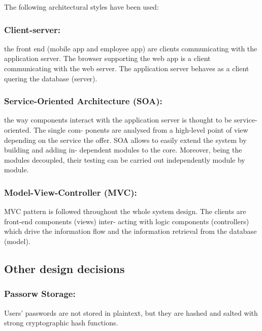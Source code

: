 	The following architectural styles have been used:
	\subsubsection{	Client-server:}

	the front end (mobile app and employee app) are clients
	communicating with the application server. The browser supporting the web
	app is a client communicating with the web server. The application server
	behaves as a client quering the database (server).
	
	\subsubsection{Service-Oriented Architecture (SOA):}

	the way components interact
	with the application server is thought to be service-oriented. The single com-
	ponents are analysed from a high-level point of view depending on the service
	the offer. SOA allows to easily extend the system by building and adding in-
	dependent modules to the core. Moreover, being the modules decoupled, their
	testing can be carried out independently module by module.
	
	\subsubsection{Model-View-Controller (MVC):}

	MVC pattern is followed throughout
	the whole system design. The clients are front-end components (views) inter-
	acting with logic components (controllers) which drive the information flow and
	the information retrieval from the database (model).
	
\subsection{Other design decisions}
	\subsubsection{Passorw Storage:}
	Users’ passwords are not stored in plaintext, but they are hashed and salted
	with strong cryptographic hash functions.